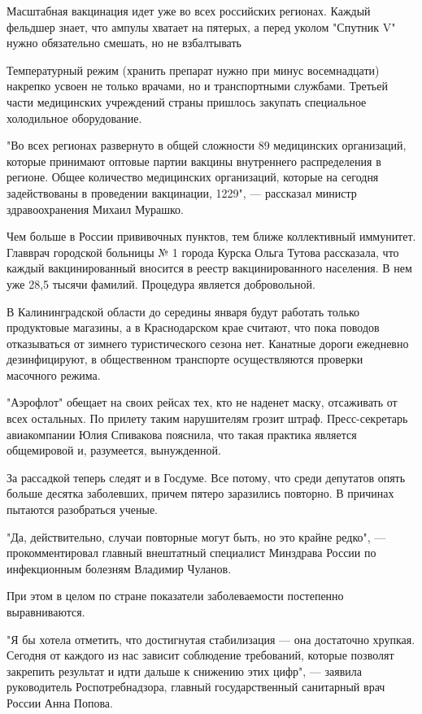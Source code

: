 Масштабная вакцинация идет уже во всех российских регионах. Каждый фельдшер
знает, что ампулы хватает на пятерых, а перед уколом "Спутник V" нужно
обязательно смешать, но не взбалтывать

Температурный режим (хранить препарат нужно при минус восемнадцати) накрепко
усвоен не только врачами, но и транспортными службами. Третьей части
медицинских учреждений страны пришлось закупать специальное холодильное
оборудование.

"Во всех регионах развернуто в общей сложности 89 медицинских организаций,
которые принимают оптовые партии вакцины внутреннего распределения в
регионе. Общее количество медицинских организаций, которые на сегодня
задействованы в проведении вакцинации, 1229", — рассказал министр
здравоохранения Михаил Мурашко.

Чем больше в России прививочных пунктов, тем ближе коллективный иммунитет.
Главврач городской больницы № 1 города Курска Ольга Тутова рассказала, что
каждый вакцинированный вносится в реестр вакцинированного населения. В нем уже
28,5 тысячи фамилий. Процедура является добровольной.

В Калининградской области до середины января будут работать только продуктовые
магазины, а в Краснодарском крае считают, что пока поводов отказываться от
зимнего туристического сезона нет. Канатные дороги ежедневно дезинфицируют, в
общественном транспорте осуществляются проверки масочного режима.

"Аэрофлот" обещает на своих рейсах тех, кто не наденет маску, отсаживать от
всех остальных. По прилету таким нарушителям грозит штраф. Пресс-секретарь
авиакомпании Юлия Спивакова пояснила, что такая практика является общемировой
и, разумеется, вынужденной.

За рассадкой теперь следят и в Госдуме. Все потому, что среди депутатов опять
больше десятка заболевших, причем пятеро заразились повторно. В причинах
пытаются разобраться ученые.

"Да, действительно, случаи повторные могут быть, но это крайне редко", —
прокомментировал главный внештатный специалист Минздрава России по инфекционным
болезням Владимир Чуланов.

При этом в целом по стране показатели заболеваемости постепенно выравниваются.

"Я бы хотела отметить, что достигнутая стабилизация — она достаточно хрупкая.
Сегодня от каждого из нас зависит соблюдение требований, которые позволят
закрепить результат и идти дальше к снижению этих цифр", — заявила руководитель
Роспотребнадзора, главный государственный санитарный врач России Анна Попова.

